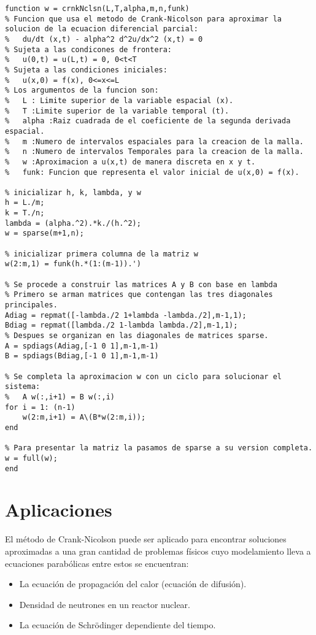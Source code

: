 \documentclass[11pt]{article} %
\begin{document}
\begin{lstlisting}[style=Matlab-editor]
function w = crnkNclsn(L,T,alpha,m,n,funk)
% Funcion que usa el metodo de Crank-Nicolson para aproximar la solucion de la ecuacion diferencial parcial:
%	du/dt (x,t) - alpha^2 d^2u/dx^2 (x,t) = 0
% Sujeta a las condicones de frontera:
%	u(0,t) = u(L,t) = 0, 0<t<T
% Sujeta a las condiciones iniciales:
%	u(x,0) = f(x), 0<=x<=L
% Los argumentos de la funcion son:
%	L : Limite superior de la variable espacial (x).
%	T :Limite superior de la variable temporal (t).
%	alpha :Raiz cuadrada de el coeficiente de la segunda derivada espacial.
%	m :Numero de intervalos espaciales para la creacion de la malla.
%	n :Numero de intervalos Temporales para la creacion de la malla.
%	w :Aproximacion a u(x,t) de manera discreta en x y t.
%	funk: Funcion que representa el valor inicial de u(x,0) = f(x).

% inicializar h, k, lambda, y w
h = L./m;
k = T./n;
lambda = (alpha.^2).*k./(h.^2);
w = sparse(m+1,n);

% inicializar primera columna de la matriz w
w(2:m,1) = funk(h.*(1:(m-1)).')

% Se procede a construir las matrices A y B con base en lambda
% Primero se arman matrices que contengan las tres diagonales principales.
Adiag = repmat([-lambda./2 1+lambda -lambda./2],m-1,1);
Bdiag = repmat([lambda./2 1-lambda lambda./2],m-1,1);
% Despues se organizan en las diagonales de matrices sparse.
A = spdiags(Adiag,[-1 0 1],m-1,m-1)
B = spdiags(Bdiag,[-1 0 1],m-1,m-1)

% Se completa la aproximacion w con un ciclo para solucionar el sistema:
%	A w(:,i+1) = B w(:,i)
for i = 1: (n-1)
	w(2:m,i+1) = A\(B*w(2:m,i));
end

% Para presentar la matriz la pasamos de sparse a su version completa.
w = full(w);
end
\end{lstlisting}

\section*{Aplicaciones}
El método de Crank-Nicolson puede ser aplicado para encontrar soluciones aproximadas a una gran cantidad de problemas físicos cuyo modelamiento lleva a ecuaciones parabólicas entre estos se encuentran:  
\begin{itemize}
    \item La ecuación de propagación del calor (ecuación de difusión).
    \item Densidad de neutrones en un reactor nuclear.
    \item La ecuación de Schrödinger dependiente del tiempo.
\end{itemize}


%

%

\end{document}
